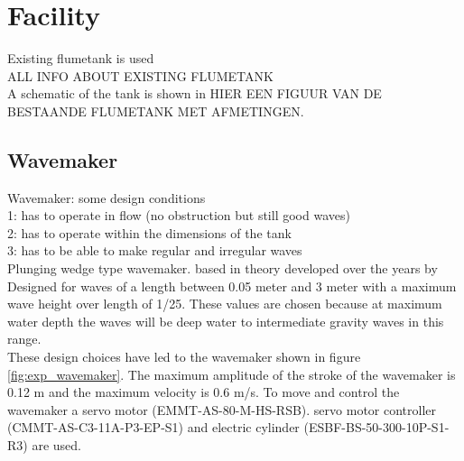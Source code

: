 \section{Facility}
\label{sec:facility}
Existing flumetank is used \\
ALL INFO ABOUT EXISTING FLUMETANK \\
A schematic of the tank is shown in HIER EEN FIGUUR VAN DE BESTAANDE FLUMETANK MET AFMETINGEN. 


\subsection{Wavemaker}
\label{sec:wavemaker}
Wavemaker: some design conditions \\
1: has to operate in flow (no obstruction but still good waves) \\
2: has to operate within the dimensions of the tank \\
3: has to be able to make regular and irregular waves \\
Plunging wedge type wavemaker. based in theory developed over the years by \citet{Madsen1970,Wu1988,Lowell2020} \\
Designed for waves of a length between 0.05 meter and 3 meter with a maximum wave height over length of 1/25. These values are chosen because at maximum water depth the waves will be deep water to intermediate gravity waves in this range. \\
These design choices have led to the wavemaker shown in figure \ref{fig:exp_wavemaker}. The maximum amplitude of the stroke of the wavemaker is 0.12 m and the maximum velocity is 0.6 m/s. To move and control the wavemaker a servo motor (EMMT-AS-80-M-HS-RSB). servo motor controller (CMMT-AS-C3-11A-P3-EP-S1) and electric cylinder (ESBF-BS-50-300-10P-S1-R3)  are used. 

